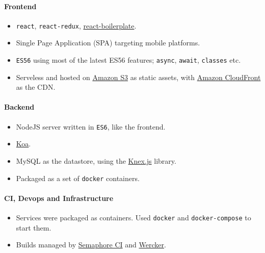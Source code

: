 \documentclass[
  a4paper,
]{article}
\providecommand{\tightlist}{%
  \setlength{\itemsep}{0pt}\setlength{\parskip}{0pt}}
\begin{document}
\begin{multicols*}{2}
\hypertarget{frontend}{%
\paragraph{Frontend}\label{frontend}}

\begin{itemize}
\tightlist
\item
  \texttt{react}, \texttt{react-redux},
  \href{https://www.reactboilerplate.com/}{react-boilerplate}.
\item
  Single Page Application (SPA) targeting mobile platforms.
\item
  \texttt{ES56} using most of the latest ES56 features; \texttt{async},
  \texttt{await}, \texttt{classes} etc.
\item
  Serveless and hosted on \href{https://aws.amazon.com/s3/}{Amazon S3}
  as static assets, with \href{http://aws.amazon.com/cloudfront/}{Amazon
  CloudFront} as the CDN.
\end{itemize}

\hypertarget{backend}{%
\paragraph{Backend}\label{backend}}

\begin{itemize}
\tightlist
\item
  NodeJS server written in \texttt{ES6}, like the frontend.
\item
  \href{http://koajs.com}{Koa}.
\item
  MySQL as the datastore, using the \href{http://knexjs.org/}{Knex.js}
  library.
\item
  Packaged as a set of \texttt{docker} containers.
\end{itemize}

\hypertarget{ci-devops-and-infrastructure}{%
\paragraph{CI, Devops and
Infrastructure}\label{ci-devops-and-infrastructure}}

\begin{itemize}
\tightlist
\item
  Services were packaged as containers. Used \texttt{docker} and
  \texttt{docker-compose} to start them.
\item
  Builds managed by \href{https://semaphoreci.com}{Semaphore CI} and
  \href{http://www.wercker.com/}{Wercker}.
\end{itemize}


\end{multicols*}
\end{document}
